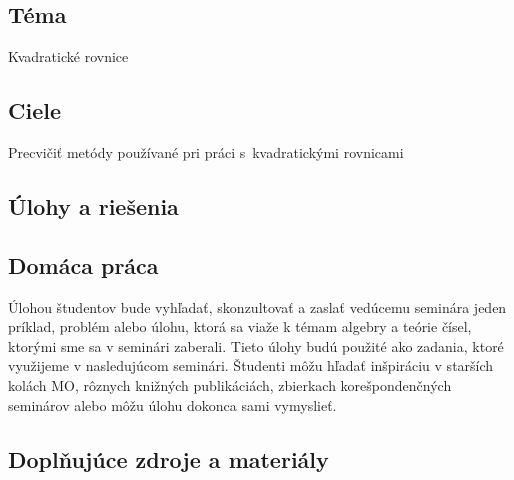 
\subsection*{Téma}
Kvadratické rovnice

\subsection*{Ciele}
Precvičiť metódy používané pri práci s~kvadratickými rovnicami

\subsection*{Úlohy a riešenia}















\subsection*{Domáca práca}

Úlohou študentov bude vyhľadať, skonzultovať a zaslať vedúcemu seminára jeden príklad, problém alebo úlohu, ktorá sa viaže k témam algebry a teórie čísel, ktorými sme sa v seminári zaberali. Tieto úlohy budú použité ako zadania, ktoré využijeme v nasledujúcom seminári. Študenti môžu hľadať inšpiráciu v starších kolách MO, rôznych knižných publikáciách, zbierkach korešpondenčných seminárov alebo môžu úlohu dokonca sami vymyslieť.


\subsection*{Doplňujúce zdroje a materiály}



